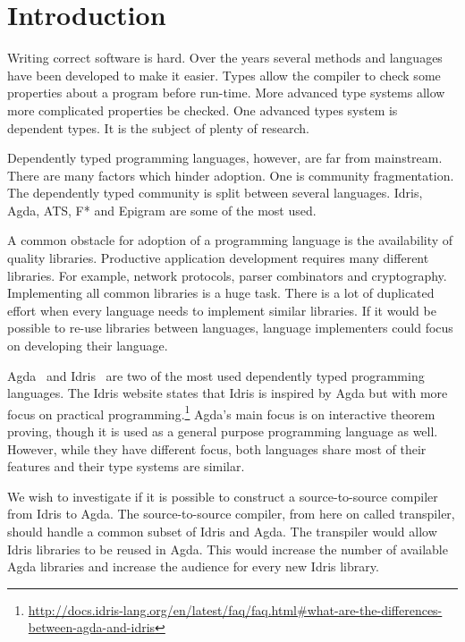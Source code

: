 \chapter{Introduction}

Writing correct software is hard. Over the years several methods and languages
have been developed to make it easier. Types allow the compiler to check some
properties about a program before run-time. More advanced type systems allow
more complicated properties be checked.
One advanced types system is dependent types. It is the subject of plenty
of research.

Dependently typed programming languages, however, are far from mainstream.
There are many factors which hinder adoption. One is community fragmentation.
The dependently typed community is split between several languages.
Idris, Agda, ATS, F* and Epigram are some of the most used.

A common obstacle for adoption of a programming language is the
availability of quality libraries. Productive application development requires
many different libraries.  For example, network protocols, parser combinators
and cryptography.  Implementing all common libraries is a huge task.  There is
a lot of duplicated effort when every language needs to implement similar
libraries.  If it would be possible to re-use libraries between languages,
language implementers could focus on developing their language.

Agda~\cite{agda} and Idris~\cite{idris} are two of the most used dependently
typed programming languages.
The Idris website states that Idris is inspired
by Agda but with more focus on practical
programming.\footnote{\url{http://docs.idris-lang.org/en/latest/faq/faq.html\#what-are-the-differences-between-agda-and-idris}}
Agda's main focus is on interactive theorem proving, though it is used as
a general purpose programming language as well.  However, while they have
different focus, both languages share most of their features and their type
systems are similar.

We wish to investigate if it is possible to construct a source-to-source
compiler from Idris to Agda. The source-to-source compiler, from here on called
transpiler, should handle a common subset of Idris and Agda.  The transpiler
would allow Idris libraries to be reused in Agda. This would increase the
number of available Agda libraries and increase the audience for every new
Idris library.

